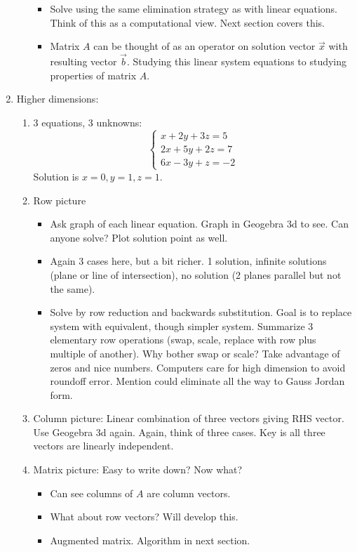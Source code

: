 \documentclass{article}
\begin{document}
\begin{enumerate}
\begin{enumerate}
\begin{itemize}
\item Solve using the same elimination strategy as with linear equations. Think of this as a computational view. Next section covers this.

\item Matrix $A$ can be thought of as an operator on solution vector $\vec{x}$ with resulting vector $\vec{b}$. Studying this linear system equations to studying properties of matrix $A$. 
\end{itemize}

\end{enumerate}


\item Higher dimensions:
\begin{enumerate}

\item 3 equations, 3 unknowns:
\[
\begin{cases}
x+2y+3z = 5 \\
2x+5y+2z = 7 \\
6x-3y+z = -2
\end{cases}
\]
Solution is $x=0,y=1,z=1$. 
\item Row picture
\begin{itemize}
\item Ask graph of each linear equation. Graph in Geogebra 3d to see. Can anyone solve? Plot solution point as well.

\item Again 3 cases here, but a bit richer. 1 solution, infinite solutions (plane or line of intersection), no solution (2 planes parallel but not the same). 

\item Solve by row reduction and backwards substitution. Goal is to replace system with equivalent, though simpler system. Summarize 3 elementary row operations (swap, scale, replace with row plus multiple of another). Why bother swap or scale? Take advantage of zeros and nice numbers. Computers care for high dimension to avoid roundoff error. Mention could eliminate all the way to Gauss Jordan form.

\end{itemize}

\item Column picture: Linear combination of three vectors giving RHS vector. Use Geogebra 3d again. Again, think of three cases. Key is all three vectors are linearly independent.

\item Matrix picture: Easy to write down? Now what?
\begin{itemize}
\item Can see columns of $A$ are column vectors. 
\item What about row vectors? Will develop this.
\item Augmented matrix. Algorithm in next section.
\end{itemize}


\end{enumerate}
\end{enumerate}
\end{document}
